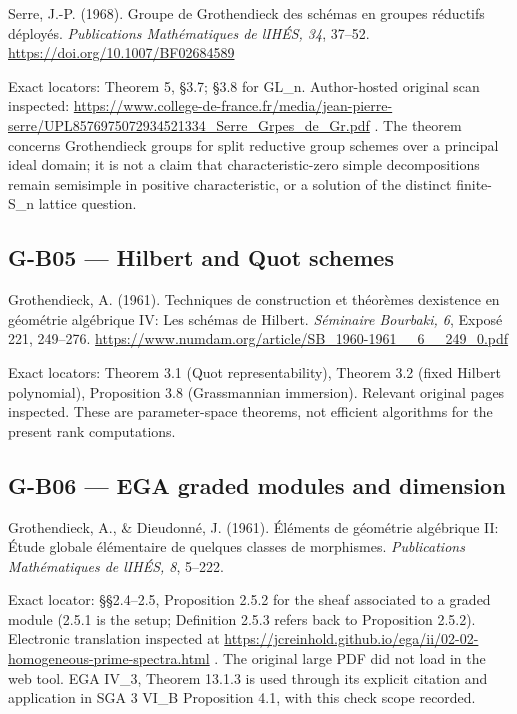 \documentclass[11pt,a4paper]{article}
\theoremstyle{definition}\newtheorem{definition}{Definition}
\begin{document}
Serre, J.-P. (1968). Groupe de Grothendieck des schémas en groupes
réductifs déployés. \emph{Publications Mathématiques de
l\textquotesingle IHÉS, 34}, 37--52.
\url{https://doi.org/10.1007/BF02684589}

Exact locators: Theorem 5, §3.7; §3.8 for GL\_n. Author-hosted original
scan inspected:
\url{https://www.college-de-france.fr/media/jean-pierre-serre/UPL8576975072934521334_Serre_Grpes_de_Gr.pdf}
. The theorem concerns Grothendieck groups for split reductive group
schemes over a principal ideal domain; it is not a claim that
characteristic-zero simple decompositions remain semisimple in positive
characteristic, or a solution of the distinct finite-S\_n lattice
question.

\subsection{G-B05 --- Hilbert and Quot
schemes}\label{g-b05--hilbert-and-quot-schemes}

Grothendieck, A. (1961). Techniques de construction et théorèmes
d\textquotesingle existence en géométrie algébrique IV: Les schémas de
Hilbert. \emph{Séminaire Bourbaki, 6}, Exposé 221, 249--276.
\url{https://www.numdam.org/article/SB_1960-1961__6__249_0.pdf}

Exact locators: Theorem 3.1 (Quot representability), Theorem 3.2 (fixed
Hilbert polynomial), Proposition 3.8 (Grassmannian immersion). Relevant
original pages inspected. These are parameter-space theorems, not
efficient algorithms for the present rank computations.

\subsection{G-B06 --- EGA graded modules and
dimension}\label{g-b06--ega-graded-modules-and-dimension}

Grothendieck, A., \& Dieudonné, J. (1961). Éléments de géométrie
algébrique II: Étude globale élémentaire de quelques classes de
morphismes. \emph{Publications Mathématiques de l\textquotesingle IHÉS,
8}, 5--222.

Exact locator: §§2.4--2.5, Proposition 2.5.2 for the sheaf associated to
a graded module (2.5.1 is the setup; Definition 2.5.3 refers back to
Proposition 2.5.2). Electronic translation inspected at
\url{https://jcreinhold.github.io/ega/ii/02-02-homogeneous-prime-spectra.html}
. The original large PDF did not load in the web tool. EGA IV\_3,
Theorem 13.1.3 is used through its explicit citation and application in
SGA 3 VI\_B Proposition 4.1, with this check scope recorded.
\end{document}

